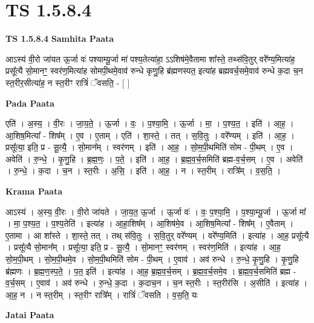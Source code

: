 \documentclass[17pt]{extarticle}
\begin{document}
\section*{ TS 1.5.8.4 }

\textbf{TS 1.5.8.4 } \newline
\textbf{Samhita Paata} \newline

आऽस्य॑ वी॒रो जा॑यत ऊ॒र्जा वः॑ पश्याम्यू॒र्जा मा॑ पश्य॒तेत्या॑हा॒ ऽऽशिष॑मे॒वैतामा शा᳚स्ते॒ तथ्स॑वि॒तुर् वरे᳚ण्य॒मित्या॑ह॒ प्रसू᳚त्यै सो॒मानꣳ॒॒ स्वर॑ण॒मित्या॑ह सोमपी॒थमे॒वाव॑ रुन्धे कृणु॒हि ब्र॑ह्मणस्पत॒ इत्या॑ह ब्रह्मवर्च॒समे॒वाव॑ रुन्धे क॒दा च॒न स्त॒रीर॒सीत्या॑ह॒ न स्त॒रीꣳ रात्रिं॑ ॅवसति॒ - [ ] \newline

\textbf{Pada Paata} \newline

एति॑ । अ॒स्य॒ । वी॒रः । जा॒य॒ते॒ । ऊ॒र्जा । वः॒ । प॒श्या॒मि॒ । ऊ॒र्जा । मा॒ । प॒श्य॒त॒ । इति॑ । आ॒ह॒ । आ॒शिष॒मित्या᳚ - शिष᳚म् । ए॒व । ए॒ताम् । एति॑ । शा॒स्ते॒ । तत् । स॒वि॒तुः । वरे᳚ण्यम् । इति॑ । आ॒ह॒ । प्रसू᳚त्या॒ इति॒ प्र - सू॒त्यै॒ । सो॒मान᳚म् । स्वर॑णम् । इति॑ । आ॒ह॒ । सो॒म॒पी॒थमिति॑ सोम - पी॒थम् । ए॒व । अवेति॑ । रु॒न्धे॒ । कृ॒णु॒हि । ब्र॒ह्म॒णः॒ । प॒ते॒ । इति॑ । आ॒ह॒ । ब्र॒ह्म॒व॒र्च॒समिति॑ ब्रह्म-व॒र्च॒सम् । ए॒व । अवेति॑ । रु॒न्धे॒ । क॒दा । च॒न । स्त॒रीः । अ॒सि॒ । इति॑ । आ॒ह॒ । न । स्त॒रीम् । रात्रि᳚म् । व॒स॒ति॒ ।  \newline


\textbf{Krama Paata} \newline

आऽस्य॑ । अ॒स्य॒ वी॒रः । वी॒रो जा॑यते । जा॒य॒त॒ ऊ॒र्जा । ऊ॒र्जा वः॑ । वः॒ प॒श्या॒मि॒ । प॒श्या॒म्यू॒र्जा । ऊ॒र्जा मा᳚ । मा॒ प॒श्य॒त॒ । प॒श्य॒तेति॑ । इत्या॑ह । आ॒हा॒शिष᳚म् । आ॒शिष॑मे॒व । आ॒शिष॒मित्या᳚ - शिष᳚म् । ए॒वैताम् । ए॒तामा । आ शा᳚स्ते । शा॒स्ते॒ तत् । तथ् स॑वि॒तुः । स॒वि॒तुर् वरे᳚ण्यम् । वरे᳚ण्य॒मिति॑ । इत्या॑ह । आ॒ह॒ प्रसू᳚त्यै । प्रसू᳚त्यै सो॒मान᳚म् । प्रसू᳚त्या॒ इति॒ प्र - सू॒त्यै॒ । सो॒मानꣳ॒॒ स्वर॑णम् । स्वर॑ण॒मिति॑ । इत्या॑ह । आ॒ह॒ सो॒म॒पी॒थम् । सो॒म॒पी॒थमे॒व । सो॒म॒पी॒थमिति॑ सोम - पी॒थम् । ए॒वाव॑ । अव॑ रुन्धे । रु॒न्धे॒ कृ॒णु॒हि । कृ॒णु॒हि ब्र॑ह्मणः । ब्र॒ह्म॒ण॒स्प॒ते॒ । प॒त॒ इति॑ । इत्या॑ह । आ॒ह॒ ब्र॒ह्म॒व॒र्च॒सम् । ब्र॒ह्म॒व॒र्च॒समे॒व । ब्र॒ह्म॒व॒र्च॒समिति॑ ब्रह्म - व॒र्च॒सम् । ए॒वाव॑ । अव॑ रुन्धे । रु॒न्धे॒ क॒दा । क॒दाच॒न । च॒न स्त॒रीः । स्त॒रीर॑सि । अ॒सीति॑ । इत्या॑ह । आ॒ह॒ न । न स्त॒रीम् । स्त॒रीꣳ रात्रि᳚म् । रात्रिं॑ ॅवसति । व॒स॒ति॒ यः \newline

\textbf{Jatai Paata} \newline
\end{document}
